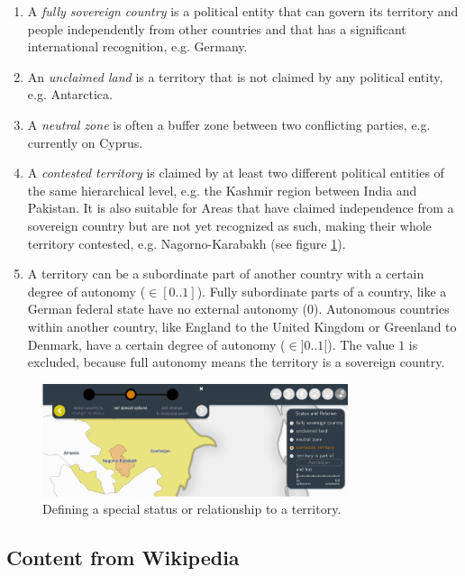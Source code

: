 \begin{enumerate}
  \item A \emph{fully sovereign country} is a political entity
  that can govern its territory and people independently from other countries and that has a significant international recognition, e.g. Germany.
  \item An \emph{unclaimed land} is a territory that is not claimed by any political entity, e.g. Antarctica.
  \item A \emph{neutral zone} is often a buffer zone between two conflicting parties, e.g. currently on Cyprus.
  \item A \emph{contested territory} is claimed by at least two different political entities of the same hierarchical level, e.g. the Kashmir region between India and Pakistan. It is also suitable for Areas that have claimed independence from a sovereign country but are not yet recognized as such, making their whole territory contested, e.g. Nagorno-Karabakh (see figure \ref{fig:uncertainty_new_status_tool}).
  \item A territory can be a subordinate part of another country with a certain degree of autonomy ($\in [0..1]$). Fully subordinate parts of a country, like a German federal state have no external autonomy ($0$). Autonomous countries within another country, like England to the United Kingdom or Greenland to Denmark, have a certain degree of autonomy ($\in ]0..1[$). The value $1$ is excluded, because full autonomy means the territory is a sovereign country.
\end{enumerate}

\begin{figure}[ht]
  \centering
  \includegraphics[width = 0.8\textwidth]{graphics/extensions/new_status_tool}
  \caption{Defining a special status or relationship to a territory.}
  \label{fig:uncertainty_new_status_tool}
\end{figure}



\subsection{Content from Wikipedia} %
\label{sub:content_from_wikipedia}

